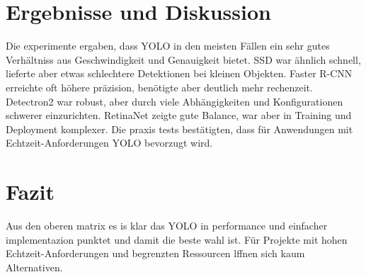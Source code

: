 \documentclass[12pt]{article}
\begin{document}
\newpage

\section{Ergebnisse und Diskussion}
Die experimente ergaben, dass YOLO in den meisten Fällen ein sehr gutes Verhältniss aus Geschwindigkeit und Genauigkeit bietet. SSD war ähnlich schnell, lieferte aber etwas schlechtere Detektionen bei kleinen Objekten. Faster R-CNN erreichte oft höhere präzision, benötigte aber deutlich mehr rechenzeit. Detectron2 war robust, aber durch viele Abhängigkeiten und Konfigurationen schwerer einzurichten. RetinaNet zeigte gute Balance, war aber in Training und Deployment komplexer. Die praxis tests bestätigten, dass für Anwendungen mit Echtzeit-Anforderungen YOLO bevorzugt wird.

\section{Fazit}
Aus den oberen matrix es is klar das YOLO in performance und einfacher implementazion punktet und damit die beste wahl ist. Für Projekte mit hohen Echtzeit-Anforderungen und begrenzten Ressourcen lffnen sich kaum Alternativen.  
\end{document}
